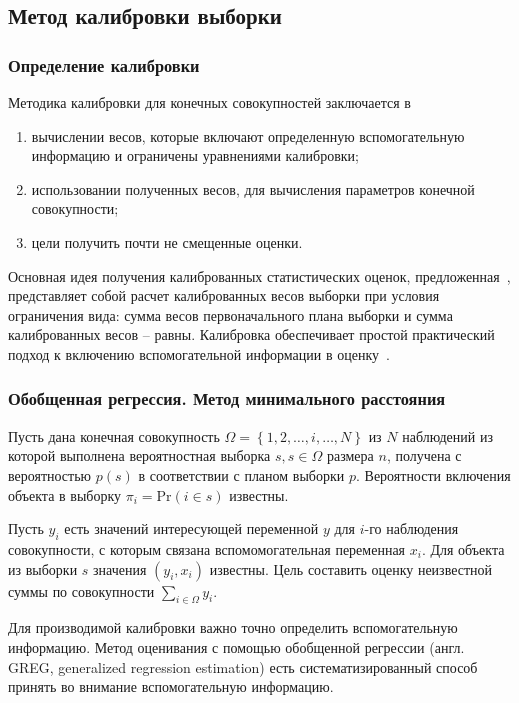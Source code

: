 \subsection{Метод калибровки выборки}
\subsubsection{Определение калибровки}

Методика калибровки для конечных совокупностей \autocite{ps:summary} заключается в
\begin{enumerate}
    \item вычислении весов, которые включают определенную вспомогательную информацию и ограничены уравнениями калибровки;
    \item использовании полученных весов, для вычисления параметров конечной совокупности;
    \item цели получить почти не смещенные оценки.
\end{enumerate}

Основная идея получения калиброванных статистических оценок, предложенная~\autocite{ps:calibration}, представляет собой
расчет калиброванных весов выборки при условия ограничения вида: сумма весов первоначального плана выборки и сумма
калиброванных весов -- равны. Калибровка обеспечивает простой практический подход к включению вспомогательной информации
в оценку~\autocite{ps:estimation}.

\subsubsection{Обобщенная регрессия. Метод минимального расстояния}

Пусть дана конечная совокупность $\Omega = \left\{1, 2, \dots, i, \dots, N \right\}$ из $N$ наблюдений из которой выполнена
вероятностная выборка $s, s\in\Omega$ размера $n$, получена с вероятностью $p(s)$ в соответствии с планом выборки $p$.
Вероятности включения объекта в выборку  $\pi_i = \text{Pr}\left( i \in s\right)$ известны.

Пусть $y_i$ есть значений интересующей переменной $y$ для $i$-го наблюдения совокупности, с которым связана 
вспомомогательная переменная $x_i$. Для объекта из выборки $s$ значения $\left(y_i, x_i\right)$ известны. Цель составить
оценку неизвестной суммы по совокупности $\sum\limits_{i \in \Omega} y_i$. 

Для производимой калибровки важно точно определить вспомогательную информацию. Метод оценивания с помощью обобщенной
регрессии (англ. GREG, generalized regression estimation) есть систематизированный способ принять во внимание
вспомогательную информацию.

